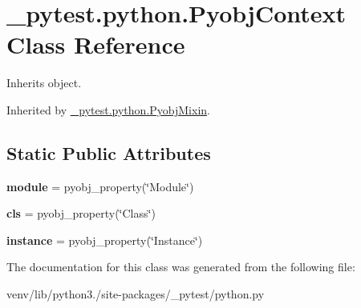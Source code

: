 \hypertarget{class__pytest_1_1python_1_1_pyobj_context}{}\section{\+\_\+pytest.\+python.\+Pyobj\+Context Class Reference}
\label{class__pytest_1_1python_1_1_pyobj_context}


Inherits object.



Inherited by \hyperlink{class__pytest_1_1python_1_1_pyobj_mixin}{\+\_\+pytest.\+python.\+Pyobj\+Mixin}.

\subsection*{Static Public Attributes}
\begin{DoxyCompactItemize}
\item 
\mbox{\label{class__pytest_1_1python_1_1_pyobj_context_afb7ed231833ddd97c70c1ed308c0fe76}} 
{\bfseries module} = pyobj\+\_\+property(\char`\"{}Module\char`\"{})
\item 
\mbox{\label{class__pytest_1_1python_1_1_pyobj_context_a399bf42dd810167b52ecec7d35872257}} 
{\bfseries cls} = pyobj\+\_\+property(\char`\"{}Class\char`\"{})
\item 
\mbox{\label{class__pytest_1_1python_1_1_pyobj_context_a7e354999b9722a7094742e493016473c}} 
{\bfseries instance} = pyobj\+\_\+property(\char`\"{}Instance\char`\"{})
\end{DoxyCompactItemize}


The documentation for this class was generated from the following file\+:\begin{DoxyCompactItemize}
\item 
venv/lib/python3./site-\/packages/\+\_\+pytest/python.\+py\end{DoxyCompactItemize}
